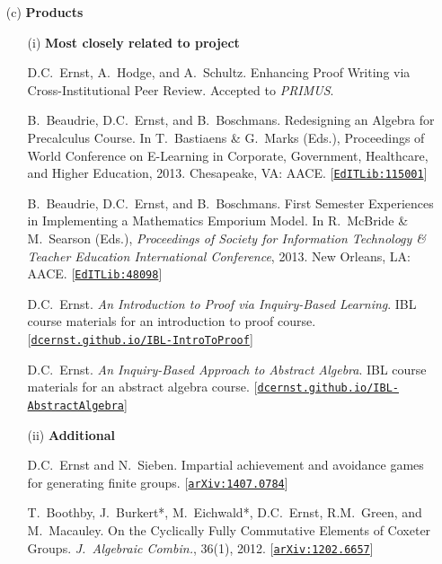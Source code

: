 \documentclass[11pt]{article}
\begin{document}
\begin{enumerate}[leftmargin=*]
\item[(c)] \textbf{Products}

\begin{enumerate}[leftmargin=\parindent]
\item[(i)] \textbf{Most closely related to project}

D.C.~Ernst, A.~Hodge, and A.~Schultz.  Enhancing Proof Writing via Cross-Institutional Peer Review. Accepted to \emph{PRIMUS}.

\vspace{.25em}

B.~Beaudrie, D.C.~Ernst, and B.~Boschmans. Redesigning an Algebra for Precalculus Course. In T.~Bastiaens \& G.~Marks (Eds.), Proceedings of World Conference on E-Learning in Corporate, Government, Healthcare, and Higher Education, 2013. Chesapeake, VA: AACE. [\href{http://www.editlib.org/p/115001/}{\texttt{EdITLib:115001}}]

\vspace{.25em}

B.~Beaudrie, D.C.~Ernst, and B.~Boschmans. First Semester Experiences in Implementing a Mathematics Emporium Model. In R.~McBride \& M.~Searson (Eds.), \emph{Proceedings of Society for Information Technology \& Teacher Education International Conference}, 2013.  New Orleans, LA: AACE.  [\href{http://www.editlib.org/p/48098}{\texttt{EdITLib:48098}}]

\vspace{.25em}

D.C.~Ernst. \emph{An Introduction to Proof via Inquiry-Based Learning}.  IBL course materials for an introduction to proof course. [\href{http://dcernst.github.io/IBL-IntroToProof}{\texttt{dcernst.github.io/IBL-IntroToProof}}]

\vspace{.25em}

D.C.~Ernst. \emph{An Inquiry-Based Approach to Abstract Algebra}.  IBL course materials for an abstract algebra course. [\href{http://dcernst.github.io/IBL-AbstractAlgebra}{\texttt{dcernst.github.io/IBL-AbstractAlgebra}}]
 
\item[(ii)] \textbf{Additional}

D.C.~Ernst and N.~Sieben. Impartial achievement and avoidance games for generating finite groups. [\href{http://arxiv.org/abs/1407.0784}{\texttt{arXiv:1407.0784}}]

\vspace{.25em}

T.~Boothby, J.~Burkert*, M.~Eichwald*, D.C.~Ernst, R.M.~Green, and M.~Macauley. On the Cyclically Fully Commutative Elements of Coxeter Groups.  \emph{J.~Algebraic Combin.}, 36(1), 2012.  [\href{http://arxiv.org/abs/1202.6657}{\texttt{arXiv:1202.6657}}]


\end{enumerate}
\end{enumerate}
\end{document}
